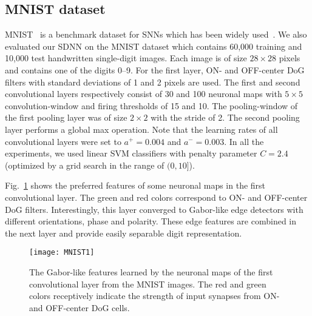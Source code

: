 \documentclass[preprint,5p,12pt,twocolumn]{article}
\begin{document}
\subsection*{MNIST dataset}
MNIST~\cite{lecun1998gradient} is a benchmark dataset for SNNs which has been widely used~\cite{hussain2014improved,zhao2015feedforward,querlioz2013immunity,o2015real,diehl2015unsupervised,diehl2015fast}. We also evaluated our SDNN on the MNIST dataset which contains 60,000 training and 10,000 test handwritten single-digit images.  Each image is of size $28 \times 28$ pixels and contains one of the digits 0--9. For the first layer, ON- and OFF-center DoG filters with standard deviations of 1 and 2 pixels are used. The first and second convolutional layers respectively consist of 30 and 100 neuronal maps with $5 \times 5$ convolution-window and firing thresholds of 15 and 10. The pooling-window of the first pooling layer was of size $2 \times 2$ with the stride of 2. The second pooling layer performs a global max operation. Note that the learning rates of all convolutional layers were set to $a^{+}=0.004$ and $a^{-}=0.003$. In all the experiments, we used linear SVM classifiers with penalty parameter $C=2.4$ (optimized by a grid search in the range of $(0,10]$).


Fig.~\ref{figure5} shows the preferred features of some neuronal maps in the first  convolutional layer. The green and red colors correspond to ON- and OFF-center DoG filters. Interestingly, this layer converged to Gabor-like edge detectors with different orientations, phase and polarity. These edge features are combined in the next layer and provide easily separable digit representation.

\begin{figure}[!tb]
\centering
\texttt{[image: MNIST1]}
\caption{The Gabor-like features learned by the neuronal maps of the first convolutional layer from the MNIST images. The red and green colors receptively indicate the  strength of input synapses from ON- and OFF-center DoG cells.}
\label{figure5}
\end{figure}
\end{document}
